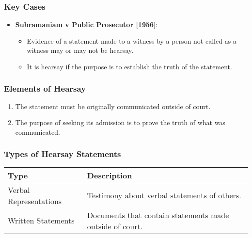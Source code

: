 \subsubsection{Key Cases}\label{key-cases-1}

\begin{itemize}
\tightlist
\item
  \textbf{Subramaniam v Public Prosecutor {[}1956{]}}:

  \begin{itemize}
  \tightlist
  \item
    Evidence of a statement made to a witness by a person not called as
    a witness may or may not be hearsay.
  \item
    It is hearsay if the purpose is to establish the truth of the
    statement.
  \end{itemize}
\end{itemize}

\subsubsection{Elements of Hearsay}\label{elements-of-hearsay}

\begin{enumerate}
\def\labelenumi{\arabic{enumi}.}
\tightlist
\item
  The statement must be originally communicated outside of court.
\item
  The purpose of seeking its admission is to prove the truth of what was
  communicated.
\end{enumerate}

\subsubsection{Types of Hearsay
Statements}\label{types-of-hearsay-statements}

\begin{longtable}[]{@{}
  >{\raggedright\arraybackslash}p{}
  >{\raggedright\arraybackslash}p{}@{}}
\toprule\noalign{}
\begin{minipage}[b]{\linewidth}\raggedright
Type
\end{minipage} & \begin{minipage}[b]{\linewidth}\raggedright
Description
\end{minipage} \\
\midrule\noalign{}
\endhead
\bottomrule\noalign{}
\endlastfoot
Verbal Representations & Testimony about verbal statements of others. \\
Written Statements & Documents that contain statements made outside of
court. \\
\end{longtable}

